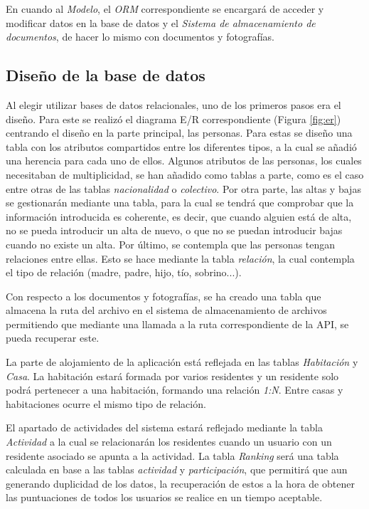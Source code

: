 En cuando al \textit{Modelo}, el \textit{ORM} correspondiente se encargará de acceder y modificar datos en la base de datos y el \textit{Sistema de almacenamiento de documentos}, de hacer lo mismo con documentos y fotografías.   

\subsection{Diseño de la base de datos}

Al elegir utilizar bases de datos relacionales, uno de los primeros pasos era el diseño. Para este se realizó el diagrama E/R correspondiente (Figura \ref{fig:er}) centrando el diseño en la parte principal, las personas. Para estas se diseño una tabla con los atributos compartidos entre los diferentes tipos, a la cual se añadió una herencia para cada uno de ellos. Algunos atributos de las personas, los cuales necesitaban de multiplicidad, se han añadido como tablas a parte, como es el caso entre otras de las tablas \textit{nacionalidad} o \textit{colectivo}. Por otra parte, las altas y bajas se gestionarán mediante una tabla, para la cual se tendrá que comprobar que la información introducida es coherente, es decir, que cuando alguien está de alta, no se pueda introducir un alta de nuevo, o que no se puedan introducir bajas cuando no existe un alta. Por último, se contempla que las personas tengan relaciones entre ellas. Esto se hace mediante la tabla \textit{relación}, la cual contempla el tipo de relación (madre, padre, hijo, tío, sobrino...).

Con respecto a los documentos y fotografías, se ha creado una tabla que almacena la ruta del archivo en el sistema de almacenamiento de archivos permitiendo que mediante una llamada a la ruta correspondiente de la API, se pueda recuperar este.

La parte de alojamiento de la aplicación está reflejada en las tablas \textit{Habitación} y \textit{Casa}. La habitación estará formada por varios residentes y un residente solo podrá pertenecer a una habitación, formando una relación \textit{1:N}. Entre casas y habitaciones ocurre el mismo tipo de relación. 

El apartado de actividades del sistema estará reflejado mediante la tabla \textit{Actividad} a la cual se relacionarán los residentes cuando un usuario con un residente asociado se apunta a la actividad. La tabla \textit{Ranking} será una tabla calculada en base a las tablas \textit{actividad} y \textit{participación}, que permitirá que aun generando duplicidad de los datos, la recuperación de estos a la hora de obtener las puntuaciones de todos los usuarios se realice en un tiempo aceptable. 

